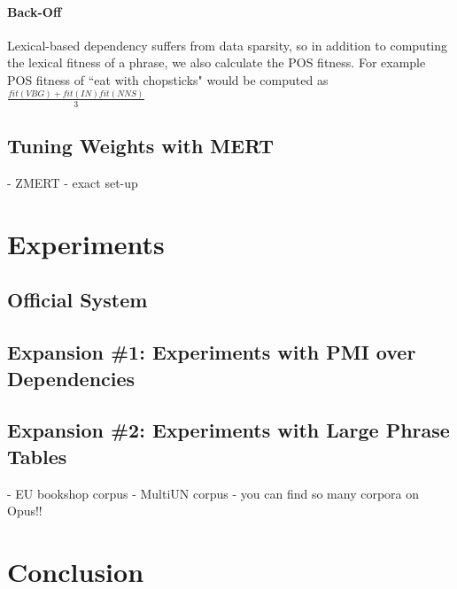 \documentclass[11pt]{article}
\begin{document}
\paragraph{Back-Off}
Lexical-based dependency suffers from data sparsity, so in addition to computing the lexical fitness of a phrase, we also calculate the POS fitness. For example POS fitness of ``eat with chopsticks" would be computed as\\
$  \frac{fit(VBG) + fit(IN) fit(NNS)}{3}  $\\



\subsection{Tuning Weights with MERT}
- ZMERT \cite{zaidan:zmert:09}
- exact set-up

\section{Experiments}

\subsection{Official System}
\cite{nltkbook}

\subsection{Expansion \#1: Experiments with PMI over Dependencies}

\subsection{Expansion \#2: Experiments with Large Phrase Tables}

- EU bookshop corpus
- MultiUN corpus
- you can find so many corpora on Opus!! \cite{tiedemann:12}

\section{Conclusion} 



\end{document}
